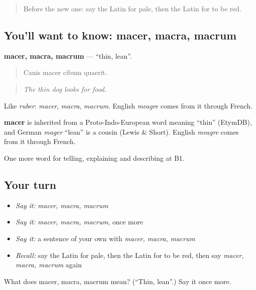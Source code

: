 \begin{quote}
Before the new one: say the Latin for pale, then the Latin for to be red.
\end{quote}

\subsection*{You'll want to know: macer, macra, macrum}
\textbf{macer, macra, macrum} — \textquotedblleft{}thin, lean\textquotedblright{}.

\begin{quote}
Canis macer cibum quaerit.
\end{quote}

\begin{quote}
\emph{The thin dog looks for food.}
\end{quote}

Like \emph{ruber}: \emph{macer}, \emph{macra}, \emph{macrum}. English \emph{meagre} comes from it through French.

\begin{cousinweb}
\textbf{macer} is inherited from a Proto-Indo-European word meaning \textquotedblleft{}thin\textquotedblright{} (EtymDB), and German \emph{mager} \textquotedblleft{}lean\textquotedblright{} is a cousin (Lewis \& Short). English \emph{meagre} comes from it through French.
\end{cousinweb}

\begin{grammarlens}[title={What you've built}]
One more word for telling, explaining and describing at B1.
\end{grammarlens}

\subsection*{Your turn}
\begin{itemize}
\raggedright
  \item \emph{Say it:} \emph{macer, macra, macrum}
  \item \emph{Say it:} \emph{macer, macra, macrum}, once more
  \item \emph{Say it:} a sentence of your own with \emph{macer, macra, macrum}
  \item \emph{Recall:} say the Latin for pale, then the Latin for to be red, then say \emph{macer, macra, macrum} again
\end{itemize}

\begin{tcolorbox}[breakable,colback=teal!4,colframe=teal!35!black,title={Before you move on}]
What does macer, macra, macrum mean? (\textquotedblleft{}Thin, lean\textquotedblright{}.) Say it once more.
\end{tcolorbox}
